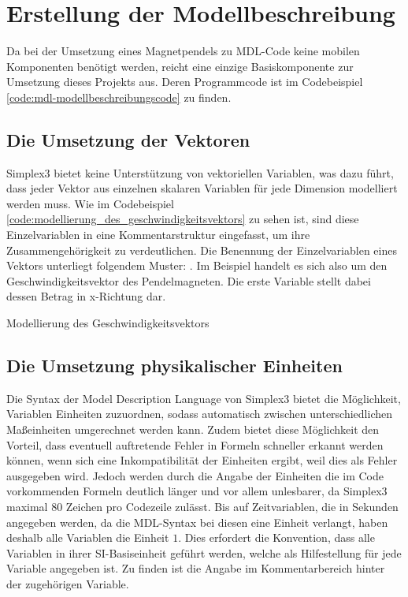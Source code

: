 \section{Erstellung der Modellbeschreibung}
\label{sec:erstellung_der_modellbeschreibung}

Da bei der Umsetzung eines Magnetpendels zu MDL-Code keine mobilen Komponenten benötigt werden, reicht eine einzige Basiskomponente zur Umsetzung dieses Projekts aus. Deren Programmcode ist im Codebeispiel \ref{code:mdl-modellbeschreibungscode} zu finden.

\subsection{Die Umsetzung der Vektoren}
\label{ssec:die_umsetzung_der_vektoren}

Simplex3 bietet keine Unterstützung von vektoriellen Variablen, was dazu führt, dass jeder Vektor aus einzelnen skalaren Variablen für jede Dimension modelliert werden muss. Wie im Codebeispiel \ref{code:modellierung_des_geschwindigkeitsvektors} zu sehen ist, sind diese Einzelvariablen in eine Kommentarstruktur eingefasst, um ihre Zusammengehörigkeit zu verdeutlichen. Die Benennung der Einzelvariablen eines Vektors unterliegt folgendem Muster: . Im Beispiel handelt es sich also um den Geschwindigkeitsvektor des Pendelmagneten. Die erste Variable stellt dabei dessen Betrag in x-Richtung dar.

\begin{code*}

	\caption{Modellierung des Geschwindigkeitsvektors}
	\label{code:modellierung_des_geschwindigkeitsvektors}
\end{code*}

\subsection{Die Umsetzung physikalischer Einheiten}
\label{ssec:die_umsetzung_physikalischer_einheiten}

Die Syntax der Model Description Language von Simplex3 bietet die Möglichkeit, Variablen Einheiten zuzuordnen, sodass automatisch zwischen unterschiedlichen Maßeinheiten umgerechnet werden kann. Zudem bietet diese Möglichkeit den Vorteil, dass eventuell auftretende Fehler in Formeln schneller erkannt werden können, wenn sich eine Inkompatibilität der Einheiten ergibt, weil dies als Fehler ausgegeben wird. Jedoch werden durch die Angabe der Einheiten die im Code vorkommenden Formeln deutlich länger und vor allem unlesbarer, da Simplex3 maximal 80 Zeichen pro Codezeile zulässt. Bis auf Zeitvariablen, die in Sekunden angegeben werden, da die MDL-Syntax bei diesen eine Einheit verlangt, haben deshalb alle Variablen die Einheit $1$. Dies erfordert die Konvention, dass alle Variablen in ihrer SI-Basiseinheit geführt werden, welche als Hilfestellung für jede Variable angegeben ist. Zu finden ist die Angabe im Kommentarbereich hinter der zugehörigen Variable. 

